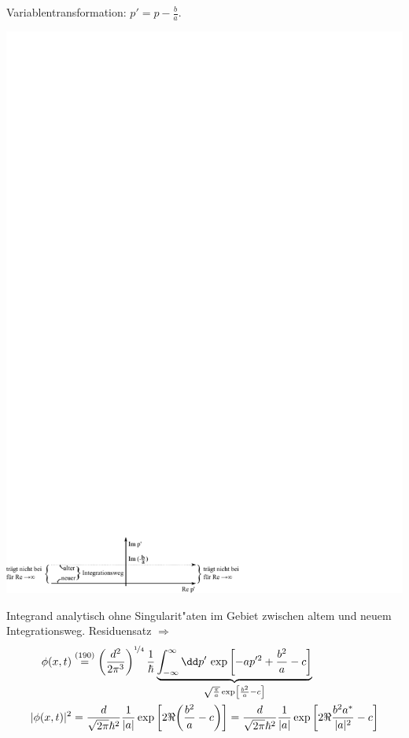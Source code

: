 \documentclass[a4paper]{scrartcl}
\begin{document}
{Variablentransformation: $p' = p - \frac b a$.
\begin{center}
\includegraphics{191Integration}
\end{center}
Integrand analytisch ohne Singularit"aten im Gebiet zwischen altem und neuem Integrationsweg. Residuensatz $\Longrightarrow$
\begin{align}
\phi(x,t) & \stackrel{(190)}= \left( \frac{ d^2}{2 \pi^3} \right)^{\nicefrac 14} \frac 1 \hbar \underbrace{ \int_{-\infty}^\infty \dd p' \, \exp \left[ - ap'^2 + \frac {b^2}a - c \right]}_{ \sqrt {\frac \pi a} \exp \left[ \frac{b^2} a - c \right]} \\
\vert \phi(x,t) \vert^2 & = \frac d{\sqrt{ 2 \pi} \hbar^2} \frac 1 {\vert a \vert} \exp \left[ 2 \Re {\left( \frac{b^2}a - c \right)} \right] = \frac{d}{\sqrt{2 \pi} \hbar^2} \frac 1 {\vert a \vert} \exp \left[ 2 \Re  \frac{b^2a^*}{\vert a \vert^2} - c \right]

\end{align}}
\end{document}
